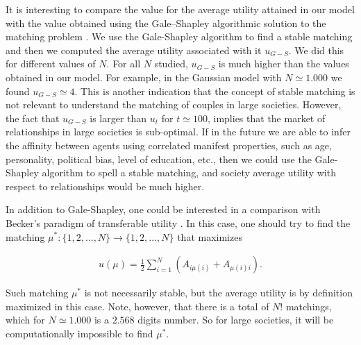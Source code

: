 \documentclass[12pt]{article}
\begin{document}
It is interesting to compare the value for the average utility attained in our model with the value obtained using the Gale–Shapley algorithmic solution to the matching problem \cite{10.2307/2312726}. We use the Gale-Shapley algorithm to find a stable matching and then we computed the average utility associated with it $u_{G-S}$. We did this for different values of $N$. For all $N$ studied, $u_{G-S}$ is much higher than the values obtained in our model. For example, in the Gaussian model with $N\simeq 1.000$ we found $u_{G-S}\simeq 4$. This is another indication that the concept of stable matching is not relevant to understand the matching of couples in large societies. However, the fact that $u_{G-S}$ is larger than $u_t$ for $t\simeq100$, implies that the market of relationships in large societies is sub-optimal. If in the future we are able to infer the affinity between agents using correlated manifest properties, such as age, personality, political bias, level of education, etc., then we could use the Gale-Shapley algorithm to spell a stable matching, and society average utility with respect to relationships would be much higher. 

In addition to Gale-Shapley, one could be interested in a comparison with Becker's paradigm of transferable utility \cite{10.2307/1831130,10.2307/1829987}. In this case, one should try to find the matching $\mu^*:\{1,2,\dots,N\}\rightarrow\{1,2,\dots,N\}$ that maximizes

\begin{align}
    u(\mu)=\frac{1}{2}\sum_{i=1}^N(A_{i\mu(i)}+A_{\mu(i)i}).
\end{align}

\noindent Such matching $\mu^*$ is not necessarily stable, but the average utility is by definition maximized in this case. Note, however, that there is a total of $N!$ matchings, which for $N\simeq1.000$ is a $2.568$ digits number. So for large societies, it will be computationally impossible to find $\mu^*$.

\end{document}
